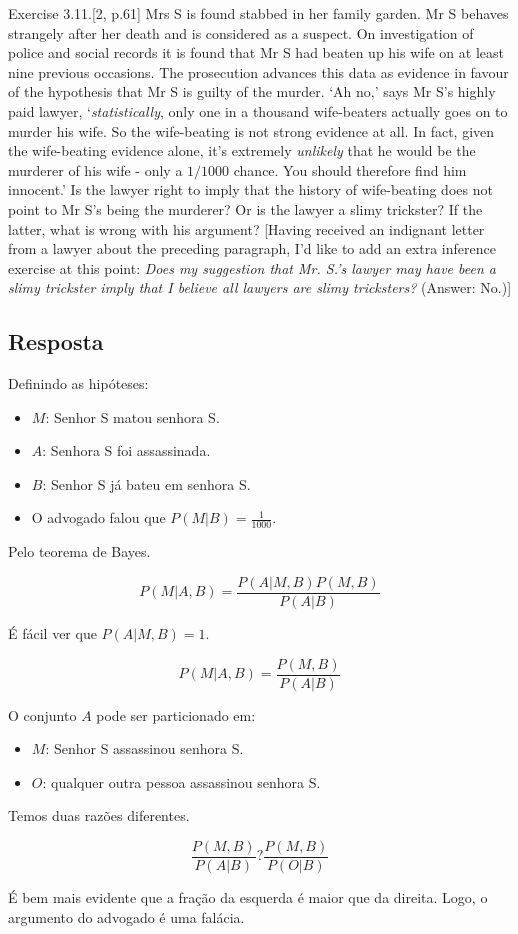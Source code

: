 \item
	Exercise 3.11.[2, p.61] Mrs S is found stabbed in her family garden. Mr S
	behaves strangely after her death and is considered as a suspect. On
	investigation of police and social records it is found that Mr S had beaten
	up his wife on at least nine previous occasions. The prosecution advances
	this data as evidence in favour of the hypothesis that Mr S is guilty of the
	murder. `Ah no,' says Mr S's highly paid lawyer, `\textit{statistically}, only one
	in a thousand wife-beaters actually goes on to murder his wife. So the
	wife-beating is not strong evidence at all. In fact, given the wife-beating
	evidence alone, it's extremely \textit{unlikely} that he would be the murderer of
	his wife - only a $1/1000$ chance. You should therefore find him innocent.'
	Is the lawyer right to imply that the history of wife-beating does not
	point to Mr S's being the murderer? Or is the lawyer a slimy trickster?
	If the latter, what is wrong with his argument?
	[Having received an indignant letter from a lawyer about the preceding
	paragraph, I'd like to add an extra inference exercise at this point: \textit{Does
	my suggestion that Mr. S.'s lawyer may have been a slimy trickster imply
	that I believe all lawyers are slimy tricksters?} (Answer: No.)]

\subsection*{Resposta}

Definindo as hipóteses:

\begin{itemize}
	\item $M$: Senhor S matou senhora S.
	\item $A$: Senhora S foi assassinada.
	\item $B$: Senhor S já bateu em senhora S.
	\item O advogado falou que $P(M|B)=\frac{1}{1000}$.
\end{itemize}

Pelo teorema de Bayes.

\[P(M|A,B) = \frac{{P(A|M,B)P(M,B)}}{{P(A|B)}}\]

É fácil ver que $P(A|M,B)=1$.

\[P(M|A,B) = \frac{{P(M,B)}}{{P(A|B)}}\]


O conjunto $A$ pode ser particionado em:

\begin{itemize}
	\item $M$: Senhor S assassinou senhora S.
	\item $O$: qualquer outra pessoa assassinou senhora S.
\end{itemize}

Temos duas razões diferentes.

\[\frac{{P(M,B)}}{{P(A|B)}}?\frac{{P(M,B)}}{{P(O|B)}}\]

É bem mais evidente que a fração da esquerda é maior que da direita. Logo,
o argumento do advogado é uma falácia.

